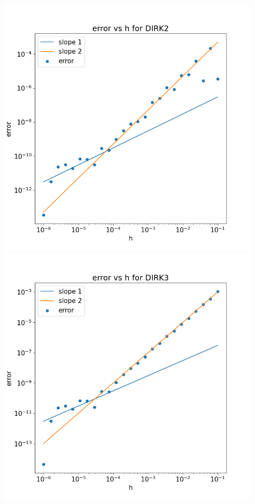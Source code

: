 \documentclass{article}
\begin{document}
\begin{enumerate}
\begin{enumerate}[label=(\alph*)]
	
	\begin{center}
		\includegraphics[scale=.3]{hw3 dirk2 err}
		\includegraphics[scale=.3]{hw3 dirk3 err}
	\end{center}
	

\end{enumerate}
\end{enumerate}
\end{document}

